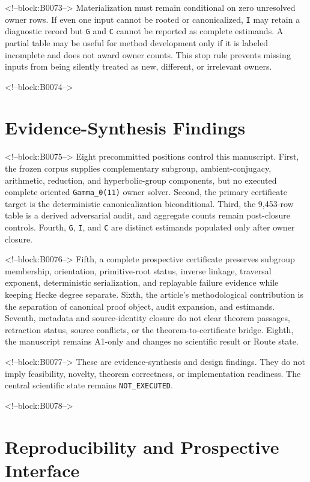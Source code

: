 \documentclass[11pt]{article}
\begin{document}
<!--block:B0073-->
Materialization must remain conditional on zero unresolved owner rows.
If even one input cannot be rooted or canonicalized, \texttt{I} may
retain a diagnostic record but \texttt{G} and \texttt{C} cannot be
reported as complete estimands. A partial table may be useful for method
development only if it is labeled incomplete and does not award owner
counts. This stop rule prevents missing inputs from being silently
treated as new, different, or irrelevant owners.

<!--block:B0074-->
\hypertarget{5-evidence-synthesis-findings}{%
\section{Evidence-Synthesis
Findings}\label{5-evidence-synthesis-findings}}

<!--block:B0075-->
Eight precommitted positions control this manuscript. First, the frozen
corpus supplies complementary subgroup, ambient-conjugacy, arithmetic,
reduction, and hyperbolic-group components, but no executed complete
oriented \texttt{Gamma\_0(11)} owner solver. Second, the primary
certificate target is the deterministic canonicalization biconditional.
Third, the 9,453-row table is a derived adversarial audit, and aggregate
counts remain post-closure controls. Fourth, \texttt{G}, \texttt{I}, and
\texttt{C} are distinct estimands populated only after owner closure.

<!--block:B0076-->
Fifth, a complete prospective certificate preserves subgroup membership,
orientation, primitive-root status, inverse linkage, traversal exponent,
deterministic serialization, and replayable failure evidence while
keeping Hecke degree separate. Sixth, the article's methodological
contribution is the separation of canonical proof object, audit
expansion, and estimands. Seventh, metadata and source-identity closure
do not clear theorem passages, retraction status, source conflicts, or
the theorem-to-certificate bridge. Eighth, the manuscript remains A1-only
and changes no scientific result or Route state.

<!--block:B0077-->
These are evidence-synthesis and design findings. They do not imply
feasibility, novelty, theorem correctness, or implementation readiness.
The central scientific state remains \texttt{NOT\_EXECUTED}.

<!--block:B0078-->
\hypertarget{6-reproducibility-and-prospective-interface}{%
\section{Reproducibility and Prospective
Interface}\label{6-reproducibility-and-prospective-interface}}
\end{document}
